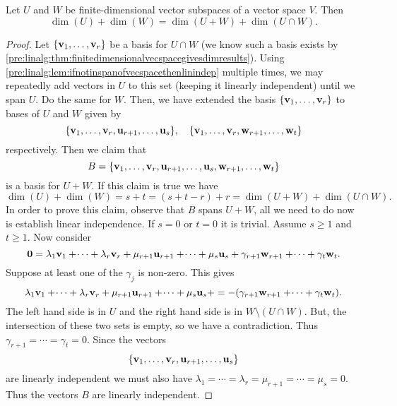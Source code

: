 \documentclass[10pt, a4paper]{article}
\begin{document}
\begin{proposition}\label{pre:linalg:prop:sumofdimsissumofsumandintersection}
    Let $U$ and $W$ be finite-dimensional vector subspaces of a vector space $V$.
    Then
    \[
    \dim(U) + \dim(W) = \dim(U + W) + \dim(U \cap W).
    \]
    \begin{proof}
        Let $\{\mathbf{v}_1, \dotsc, \mathbf{v}_r\}$ be a basis for $U \cap W$
        (we know such a basis exists by \autoref{pre:linalg:thm:finitedimensionalvecspacegivesdimresults}).
        Using \autoref{pre:linalg:lem:ifnotinspanofvecspacethenlinindep} multiple times,
        we may repeatedly add vectors in $U$ to this set
        (keeping it linearly independent)
        until we span $U$.
        Do the same for $W$.
        Then,
        we have extended the basis $\{\mathbf{v}_1, \dotsc, \mathbf{v}_r\}$ to bases of $U$ and $W$ given by
        \[
        \{\mathbf{v}_1, \dotsc, \mathbf{v}_r, \mathbf{u}_{r + 1}, \dotsc, \mathbf{u}_s\},\quad\{\mathbf{v}_1, \dotsc, \mathbf{v}_r, \mathbf{w}_{r + 1}, \dotsc, \mathbf{w}_t\}
        \]
        respectively.
        Then we claim that
        \[
        B = \{\mathbf{v}_1, \dotsc, \mathbf{v}_r, \mathbf{u}_{r + 1}, \dotsc, \mathbf{u}_s, \mathbf{w}_{r + 1}, \dotsc, \mathbf{w}_t\}
        \]
        is a basis for $U + W$.
        If this claim is true we have
        \[
        \dim(U) + \dim(W) = s + t = (s + t - r) + r = \dim(U + W) + \dim(U \cap W).
        \]
        In order to prove this claim,
        observe that $B$ spans $U + W$,
        all we need to do now is establish linear independence.
        If $s = 0$ or $t = 0$ it is trivial.
        Assume $s \geq 1$ and $t \geq 1$.
        Now consider
        \[
        \mathbf{0} = \lambda_1\mathbf{v}_1 + \dotsi + \lambda_r\mathbf{v}_r + \mu_{r + 1}\mathbf{u}_{r + 1} + \dotsi + \mu_s\mathbf{u}_s + \gamma_{r + 1}\mathbf{w}_{r + 1} + \dotsi + \gamma_t\mathbf{w}_t.
        \]
        Suppose at least one of the $\gamma_j$ is non-zero.
        This gives
        \[
        \lambda_1\mathbf{v}_1 + \dotsi + \lambda_r\mathbf{v}_r + \mu_{r + 1}\mathbf{u}_{r + 1} + \dotsi + \mu_s\mathbf{u}_s + = -(\gamma_{r + 1}\mathbf{w}_{r + 1} + \dotsi + \gamma_t\mathbf{w}_t).
        \]
        The left hand side is in $U$ and the right hand side is in $W \setminus (U \cap W)$.
        But,
        the intersection of these two sets is empty,
        so we have a contradiction.
        Thus $\gamma_{r + 1} = \dotsi = \gamma_t = 0$.
        Since the vectors
        \[
        \{\mathbf{v}_1, \dotsc, \mathbf{v}_r, \mathbf{u}_{r + 1}, \dotsc, \mathbf{u}_s\}
        \]
        are linearly independent we must also have $\lambda_1 = \dotsi = \lambda_r = \mu_{r + 1} = \dotsi = \mu_s = 0$.
        Thus the vectors $B$ are linearly independent.
    \end{proof}
\end{proposition}
\end{document}
